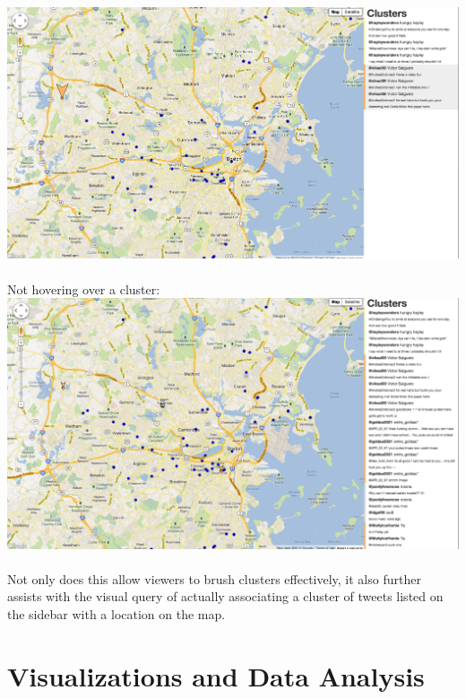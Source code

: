 \documentclass[pdftex,12pt,a4paper]{article}
\begin{document}
\includegraphics[width=5.5in]{hover1.png} \\ \\
Not hovering over a cluster: \\ 
\includegraphics[width=5.5in]{hover2.png} \\ \\
Not only does this allow viewers to brush clusters effectively, it also further assists with the visual query of actually associating a cluster of tweets listed on the sidebar with a location on the map.

\section{Visualizations and Data Analysis} 
\end{document}
